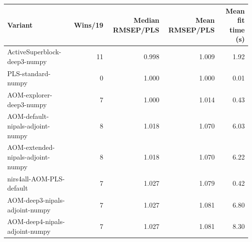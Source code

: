 \begin{tabular}{lrrrr}
\toprule
Variant & Wins/19 & Median RMSEP/PLS & Mean RMSEP/PLS & Mean fit time (s) \\
\midrule
ActiveSuperblock-deep3-numpy & 11 & 0.998 & 1.009 & 1.92 \\
PLS-standard-numpy & 0 & 1.000 & 1.000 & 0.01 \\
AOM-explorer-deep3-numpy & 7 & 1.000 & 1.014 & 0.43 \\
AOM-default-nipals-adjoint-numpy & 8 & 1.018 & 1.070 & 6.03 \\
AOM-extended-nipals-adjoint-numpy & 8 & 1.018 & 1.070 & 6.22 \\
nirs4all-AOM-PLS-default & 7 & 1.027 & 1.079 & 0.42 \\
AOM-deep3-nipals-adjoint-numpy & 7 & 1.027 & 1.081 & 6.80 \\
AOM-deep4-nipals-adjoint-numpy & 7 & 1.027 & 1.081 & 8.30 \\
\bottomrule
\end{tabular}